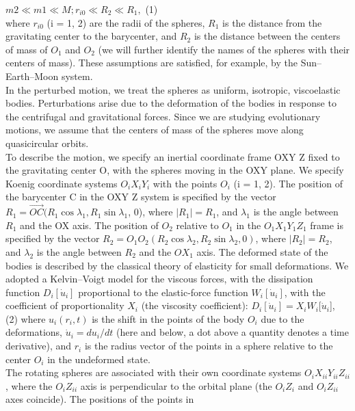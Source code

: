 \documentclass[fontsize = 11pt,a4paper]{article}
\begin{document}
\begin{multicols}{2}
$m2 \ll m1 \ll M; r_{i0} \ll  R_{2} \ll R_{1}, $ \hfill(1)\\
where $r_{i0}$ (i = 1, 2) are the radii of the spheres, $R_{1}$
is the distance from the gravitating center to the
barycenter, and $R_{2}$ is the distance between the centers
of mass of $O_{1}$ and $O_{2}$ (we will further identify
the names of the spheres with their centers of mass).
These assumptions are satisfied, for example, by the
Sun–Earth–Moon system.\\
In the perturbed motion, we treat the spheres as
uniform, isotropic, viscoelastic bodies. Perturbations
arise due to the deformation of the bodies in response
to the centrifugal and gravitational forces. Since we
are studying evolutionary motions, we assume that
the centers of mass of the spheres move along quasicircular
orbits.\\
To describe the motion, we specify an inertial
coordinate frame OXY Z fixed to the gravitating
center O, with the spheres moving in the OXY
plane. We specify Koenig coordinate systems ${O_i}{X_i}{Y_i}$
with the points ${O_i}$ (i = 1, 2). The position of the barycenter C in the OXY Z system is specified by
the vector ${R_1} = \vec{OC} ({R_1} \cos {\lambda_1}, {R_1} \sin {\lambda_1}$, 0), where
$|{R_1}| = {R_1}$, and ${\lambda_1}$ is the angle between ${R_1}$ and the
OX axis. The position of ${O_2}$ relative to ${O_1}$ in the
${O_1}{X_1}{Y_1}{Z_1}$ frame is specified by the vector ${R_2} = {O_1}{O_2}({R_2} \cos {\lambda_2}, {R_2} \sin {\lambda_2}, 0)$, where 
$|{R_2}| = {R_2}$,  and
${\lambda_2}$ is the angle between ${R_2}$ and the $O{X_1}$ axis. The
deformed state of the bodies is described by the classical
theory of elasticity for small deformations. We
adopted a Kelvin–Voigt model for the viscous forces,
with the dissipation function ${D_i}[{\dot{u}_i}]$ proportional to
the elastic-force function ${W_i}[{\dot{u}_i}]$, with the coefficient
of proportionality ${X_i}$ (the viscosity coefficient):
${D_i}[{\dot{u}_i}] = {X_i}{W_i}[{\dot{u}_i}$], (2)
where ${u_i}({r_i}, t)$ is the shift in the points of the body ${O_i}$
due to the deformations, ${\dot{u}_i} = d{u_i}/dt$ (here and below,
a dot above a quantity denotes a time derivative), and
${r_i}$ is the radius vector of the points in a sphere relative
to the center ${O_i}$ in the undeformed state.
\\
\indent The rotating spheres are associated with their own
coordinate systems ${O_i}{X_{ii}}{Y_{ii}}{Z_{ii}}$, where the ${O_i}{Z_{ii}}$ axis
is perpendicular to the orbital plane (the ${O_i}{Z_i}$ and
${O_i}{Z_{ii}}$ axes coincide). The positions of the points in

\end{multicols}
\end{document}
